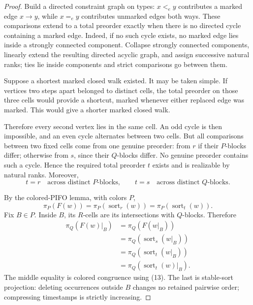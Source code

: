 \documentclass[11pt]{article}
\begin{document}
\begin{proof}
Build a directed constraint graph on types: $x<_e y$ contributes a marked edge $x\to y$, while $x=_e y$ contributes unmarked edges both ways.  These comparisons extend to a total preorder exactly when there is no directed cycle containing a marked edge.  Indeed, if no such cycle exists, no marked edge lies inside a strongly connected component.  Collapse strongly connected components, linearly extend the resulting directed acyclic graph, and assign successive natural ranks; ties lie inside components and strict comparisons go between them.

Suppose a shortest marked closed walk existed.  It may be taken simple.  If vertices two steps apart belonged to distinct cells, the total preorder on those three cells would provide a shortcut, marked whenever either replaced edge was marked.  This would give a shorter marked closed walk.

Therefore every second vertex lies in the same cell.  An odd cycle is then impossible, and an even cycle alternates between two cells.  But all comparisons between two fixed cells come from one genuine preorder: from $r$ if their $P$-blocks differ; otherwise from $s$, since their $Q$-blocks differ.  No genuine preorder contains such a cycle.  Hence the required total preorder $t$ exists and is realizable by natural ranks.  Moreover,
\begin{equation}
t=r\quad\text{across distinct $P$-blocks},\qquad
t=s\quad\text{across distinct $Q$-blocks}.
\tag{13}
\end{equation}

By the colored-PIFO lemma, with colors $P$,
\begin{equation}
\pi_P(F(w))
=\pi_P(\operatorname{sort}_r(w))
=\pi_P(\operatorname{sort}_t(w)).
\tag{14}
\end{equation}
Fix $B\in P$.  Inside $B$, its $R$-cells are its intersections with $Q$-blocks.  Therefore
\begin{equation}
\begin{aligned}
\pi_Q(F(w)|_B)
&=\pi_Q(F(w|_B))\\
&=\pi_Q(\operatorname{sort}_s(w|_B))\\
&=\pi_Q(\operatorname{sort}_t(w|_B))\\
&=\pi_Q(\operatorname{sort}_t(w)|_B).
\end{aligned}
\tag{15}
\end{equation}
The middle equality is colored congruence using (13).  The last is stable-sort projection: deleting occurrences outside $B$ changes no retained pairwise order; compressing timestamps is strictly increasing.


\end{proof}
\end{document}
